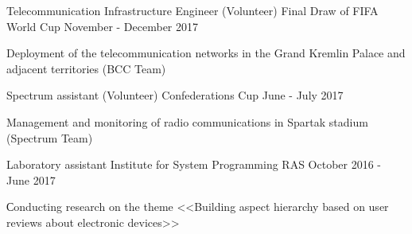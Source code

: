 \begin{cventries}
\cventry
{Telecommunication Infrastructure Engineer (Volunteer)} %
{Final Draw of FIFA World Cup} %
{} %
{November - December 2017} %
{ 
	\begin{cvitems}
		\item {Deployment of the telecommunication networks in the Grand Kremlin Palace and adjacent territories (BCC Team)}
	\end{cvitems}
}
	
\cventry
{Spectrum assistant (Volunteer)} %
{Confederations Cup} %
{} %
{June - July 2017} %
{ 
	\begin{cvitems}
		\item {Management and monitoring of radio communications in Spartak stadium (Spectrum Team)}
	\end{cvitems}
}




\cventry
{Laboratory assistant} %
{Institute for System Programming RAS} %
{} %
{October 2016 - June 2017} %
{ 
	\begin{cvitems}
		\item {Сonducting research on the theme <<Building aspect hierarchy based on user reviews about electronic devices>>}
	\end{cvitems}
}




\end{cventries}